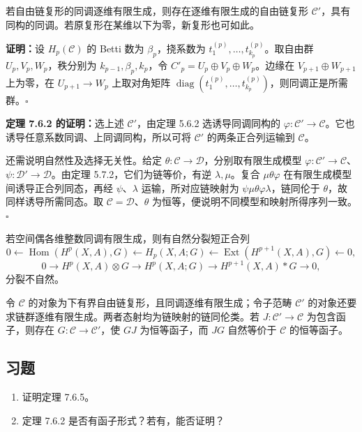 若自由链复形的同调逐维有限生成，则存在逐维有限生成的自由链复形 $\mathcal C'$，具有同构的同调。若原复形在某维以下为零，新复形也可如此。

\textbf{证明：}设 $H_p(\mathcal C)$ 的 Betti 数为 $\beta_p$，挠系数为 $t_1^{(p)},\ldots,t_{k_p}^{(p)}$。取自由群 $U_p,V_p,W_p$，秩分别为 $k_{p-1},\beta_p,k_p$，令 $C'_p=U_p\oplus V_p\oplus W_p$。边缘在 $V_{p+1}\oplus W_{p+1}$ 上为零，在 $U_{p+1}\to W_p$ 上取对角矩阵 $\operatorname{diag}(t_1^{(p)},\ldots,t_{k_p}^{(p)})$，则同调正是所需群。\hfill$\square$

\textbf{定理 7.6.2 的证明：}选上述 $\mathcal C'$，由定理 5.6.2 选诱导同调同构的 $\varphi:\mathcal C'\to\mathcal C$。它也诱导任意系数同调、上同调同构，所以可将 $\mathcal C'$ 的两条正合列运输到 $\mathcal C$。

还需说明自然性及选择无关性。给定 $\theta:\mathcal C\to\mathcal D$，分别取有限生成模型 $\varphi:\mathcal C'\to\mathcal C$、$\psi:\mathcal D'\to\mathcal D$。由定理 5.7.2，它们为链等价，有逆 $\lambda,\mu$。复合 $\mu\theta\varphi$ 在有限生成模型间诱导正合列同态，再经 $\psi$、$\lambda$ 运输，所对应链映射为 $\psi\mu\theta\varphi\lambda$，链同伦于 $\theta$，故同样诱导所需同态。取 $\mathcal C=\mathcal D$、$\theta$ 为恒等，便说明不同模型和映射所得序列一致。\hfill$\square$

若空间偶各维整数同调有限生成，则有自然分裂短正合列
\[
0\leftarrow\operatorname{Hom}(H^p(X,A),G)\leftarrow H_p(X,A;G)
\leftarrow\operatorname{Ext}(H^{p+1}(X,A),G)\leftarrow0,
\]
\[
0\to H^p(X,A)\otimes G\to H^p(X,A;G)\to H^{p+1}(X,A)*G\to0,
\]
分裂不自然。

令 $\mathcal C$ 的对象为下有界自由链复形，且同调逐维有限生成；令子范畴 $\mathcal C'$ 的对象还要求链群逐维有限生成。两者态射均为链映射的链同伦类。若 $J:\mathcal C'\to\mathcal C$ 为包含函子，则存在 $G:\mathcal C\to\mathcal C'$，使 $GJ$ 为恒等函子，而 $JG$ 自然等价于 $\mathcal C$ 的恒等函子。

\subsection*{习题}
\begin{enumerate}
\item 证明定理 7.6.5。
\item 定理 7.6.2 是否有函子形式？若有，能否证明？
\end{enumerate}
